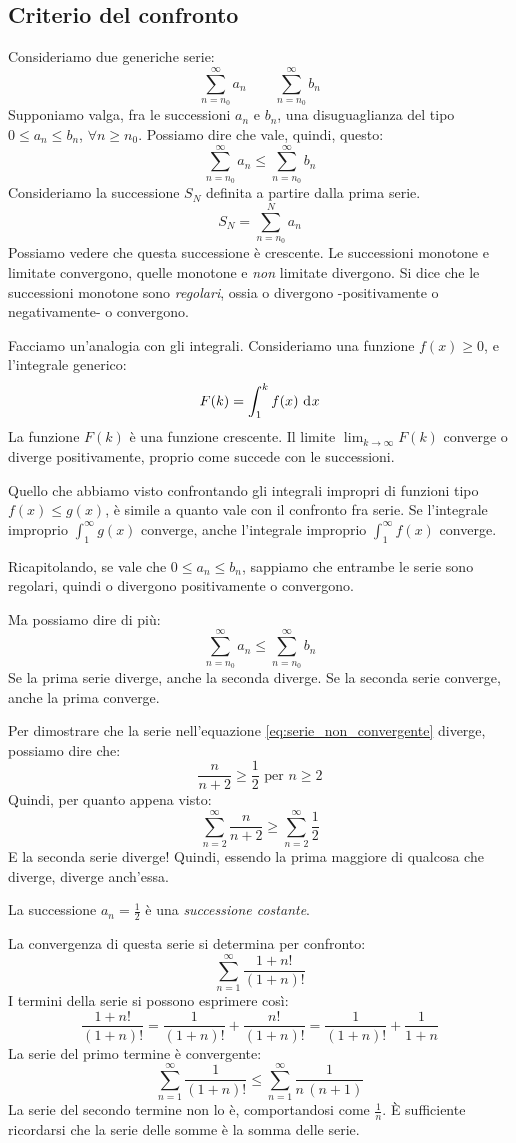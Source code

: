 \subsection{Criterio del confronto}

Consideriamo due generiche serie:
\[
\sum_{n = n_0}^{\infty} a_n \qquad
\sum_{n = n_0}^{\infty} b_n
\]
Supponiamo valga, fra le successioni $a_n$ e $b_n$, una disuguaglianza del tipo $0 \le a_n \le b_n$, $\forall n \ge n_0$. Possiamo dire che vale, quindi, questo:
\[
\sum_{n = n_0}^{\infty} a_n \le
\sum_{n = n_0}^{\infty} b_n
\]
Consideriamo la successione $S_N$ definita a partire dalla prima serie.
\[
S_N = \sum_{n = n_0}^{N} a_n
\]
Possiamo vedere che questa successione \`e crescente. Le successioni monotone e limitate convergono, quelle monotone e \emph{non} limitate divergono. Si dice che le successioni monotone sono \emph{regolari}, ossia o divergono -positivamente o negativamente- o convergono.

Facciamo un'analogia con gli integrali. Consideriamo una funzione $f(x) \ge 0$, e l'integrale generico:
\[
F(k) = \int_{1}^{k} f(x) \dx
\]
La funzione $F(k)$ \`e una funzione crescente. Il limite $\lim_{k \to \infty} F(k)$ converge o diverge positivamente, proprio come succede con le successioni.

Quello che abbiamo visto confrontando gli integrali impropri di funzioni tipo $f(x) \le g(x)$, \`e simile a quanto vale con il confronto fra serie. Se l'integrale improprio $\int_{1}^{\infty} g(x)$ converge, anche l'integrale improprio $\int_{1}^{\infty} f(x)$ converge.

Ricapitolando, se vale che $0 \le a_n \le b_n$, sappiamo che entrambe le serie sono regolari, quindi o divergono positivamente o convergono.

Ma possiamo dire di pi\`u:
\[
\sum_{n = n_0}^{\infty} a_n \le
\sum_{n = n_0}^{\infty} b_n
\]
Se la prima serie diverge, anche la seconda diverge. Se la seconda serie converge, anche la prima converge.

Per dimostrare che la serie nell'equazione \ref{eq:serie_non_convergente} diverge, possiamo dire che:
\[
\frac{n}{n+2} \ge \frac{1}{2} \text{ per } n \ge 2
\]
Quindi, per quanto appena visto:
\[
\sum_{n = 2}^{\infty} \frac{n}{n+2} \ge \sum_{n = 2}^{\infty} \frac{1}{2}
\]
E la seconda serie diverge! Quindi, essendo la prima maggiore di qualcosa che diverge, diverge anch'essa.

La successione $a_n = \frac{1}{2}$ \`e una \emph{successione costante}.

\begin{exmp}
La convergenza di questa serie si determina per confronto:
\[
\sum_{n = 1}^{\infty} \frac{1 + n!}{(1 + n)!}
\]
I termini della serie si possono esprimere cos\`i:
\[
\frac{1 + n!}{(1 + n)!} = \frac{1}{(1 + n)!} + \frac{n!}{(1 + n)!} = \frac{1}{(1 + n)!} + \frac{1}{1 + n}
\]
La serie del primo termine \`e convergente:
\[
\sum_{n = 1}^{\infty} \frac{1}{(1 + n)!} \le \sum_{n = 1}^{\infty} \frac{1}{n \, (n + 1)}
\]
La serie del secondo termine non lo \`e, comportandosi come $\frac{1}{n}$. \`E sufficiente ricordarsi che la serie delle somme \`e la somma delle serie.
\end{exmp}

